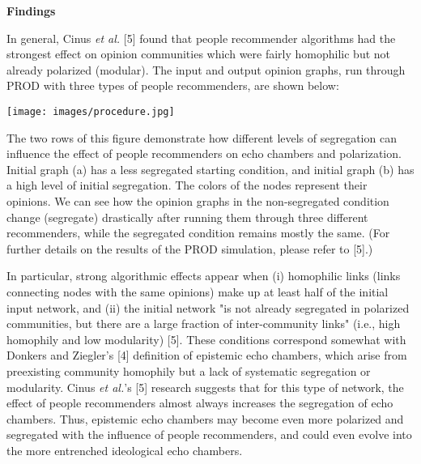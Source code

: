 \documentclass[10pt]{article}
\begin{document}
\noindent 
\textbf{Findings}

In general, Cinus \textit{et al.} [5] found that people recommender algorithms had the strongest effect on opinion communities which were fairly homophilic but not already polarized (modular). The input and output opinion graphs, run through PROD with three types of people recommenders, are shown below:  


\vspace{10mm} %

  \texttt{[image: images/procedure.jpg]}

  \vspace{5mm} %


The two rows of this figure demonstrate how different levels of segregation can influence the effect of people recommenders on echo chambers and polarization. Initial graph (a) has a less segregated starting condition, and initial graph (b) has a high level of initial segregation. The colors of the nodes represent their opinions. We can see how the opinion graphs in the non-segregated condition change (segregate) drastically after running them through three different recommenders, while the segregated condition remains mostly the same. (For further details on the results of the PROD simulation, please refer to [5].) 

In particular, strong algorithmic effects appear when (i) homophilic links (links connecting nodes with the same opinions) make up at least half of the initial input network, and (ii) the initial network  "is  not  already segregated in polarized communities, but there are a large fraction of inter-community links" (i.e., high homophily and low modularity) [5]. These conditions correspond somewhat with Donkers and Ziegler's [4] definition of epistemic echo chambers, which arise from preexisting community homophily but a lack of systematic segregation or modularity. Cinus \textit{et al.}'s [5] research suggests that for this type of network, the effect of people recommenders almost always increases the segregation of echo chambers.  Thus, epistemic echo chambers may become even more polarized and segregated with the influence of people recommenders, and could even evolve into the more entrenched ideological echo chambers.
\end{document}
